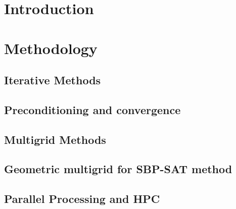 \chapter{Introduction}



\chapter{Methodology}


\section{Iterative Methods}

\section{Preconditioning and convergence}

\section{Multigrid Methods}

\section{Geometric multigrid for SBP-SAT method}

\section{Parallel Processing and HPC}



